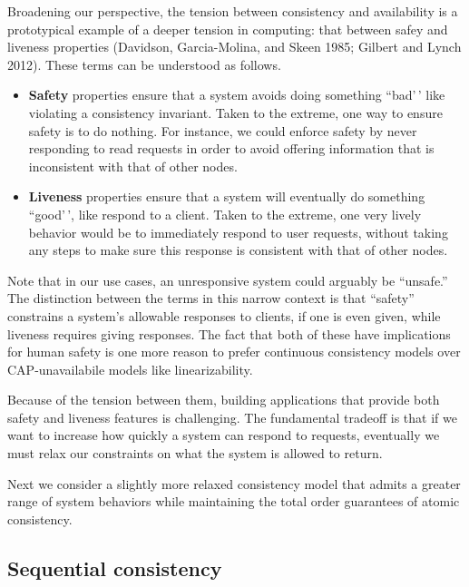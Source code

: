 \documentclass[]             %
{NASA}                       %
\theoremstyle{definition}
\begin{document}
Broadening our perspective, the tension between consistency and
availability is a prototypical example of a deeper tension in computing:
that between safey and liveness properties (Davidson, Garcia-Molina, and
Skeen 1985; Gilbert and Lynch 2012). These terms can be understood as
follows.

\begin{itemize}
\item
  \textbf{Safety} properties ensure that a system avoids doing something
  ``bad'\,' like violating a consistency invariant. Taken to the
  extreme, one way to ensure safety is to do nothing. For instance, we
  could enforce safety by never responding to read requests in order to
  avoid offering information that is inconsistent with that of other
  nodes.
\item
  \textbf{Liveness} properties ensure that a system will eventually do
  something ``good'\,', like respond to a client. Taken to the extreme,
  one very lively behavior would be to immediately respond to user
  requests, without taking any steps to make sure this response is
  consistent with that of other nodes.
\end{itemize}

Note that in our use cases, an unresponsive system could arguably be
``unsafe.'' The distinction between the terms in this narrow context is
that ``safety'' constrains a system's allowable responses to clients, if
one is even given, while liveness requires giving responses. The fact
that both of these have implications for human safety is one more reason
to prefer continuous consistency models over CAP-unavailabile models
like linearizability.

Because of the tension between them, building applications that provide
both safety and liveness features is challenging. The fundamental
tradeoff is that if we want to increase how quickly a system can respond
to requests, eventually we must relax our constraints on what the system
is allowed to return.

Next we consider a slightly more relaxed consistency model that admits a
greater range of system behaviors while maintaining the total order
guarantees of atomic consistency.

\hypertarget{sequential-consistency}{%
\subsection{Sequential consistency}\label{sequential-consistency}}
\end{document}
